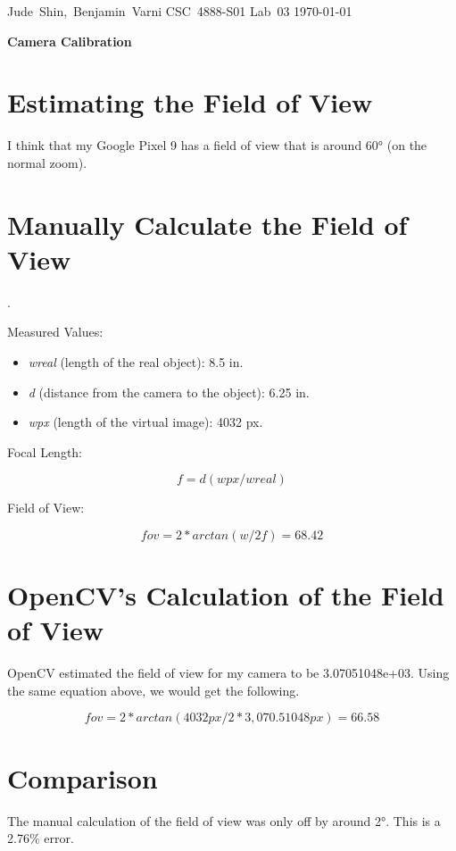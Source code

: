 \documentclass[11pt]{article}
\begin{document}
\hfill\vbox{\hbox{Jude Shin, Benjamin Varni}
		\hbox{CSC 4888-S01}	
		\hbox{Lab 03}	
		\hbox{\today}}\par

\bigskip
\centerline{\Large\bf Camera Calibration}\par
\bigskip


\section{Estimating the Field of View}

I think that my Google Pixel 9 has a field of view that is around 60° (on the normal zoom).

\section{Manually Calculate the Field of View}.

Measured Values:

\begin{itemize}

	\item \textit{wreal} (length of the real object): 8.5 in.

	\item \textit{d} (distance from the camera to the object): 6.25 in.

	\item \textit{wpx} (length of the virtual image): 4032 px. 

\end{itemize}

Focal Length:

\begin{equation}
	f = d(wpx/wreal)
\end{equation}

Field of View:

\begin{equation}
	fov = 2*arctan(w/2f) = 68.42
\end{equation}

\section{OpenCV's Calculation of the Field of View}

OpenCV estimated the field of view for my camera to be 3.07051048e+03.
Using the same equation above, we would get the following.

\begin{equation}
	fov = 2*arctan(4032px/2*3,070.51048px)
	= 66.58
\end{equation}

\section*{Comparison}

The manual calculation of the field of view was only off by around 2°.
This is a 2.76\% error.
\end{document}
